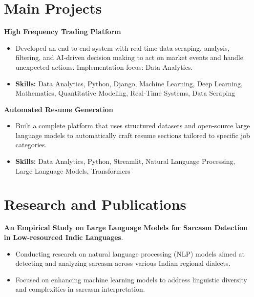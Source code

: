 \documentclass[a4paper,11pt]{article}
\begin{document}
\section{\textbf{Main Projects}}

\vspace{1mm}
  \textbf{High Frequency Trading Platform  }
\vspace{-1.5mm} %
\begin{itemize}
  \item Developed an end-to-end system with real-time data scraping, analysis, filtering, and AI-driven decision making to act on market events and handle unexpected actions. Implementation focus: Data Analytics.
\vspace{-3mm}
  \item \textbf{Skills:} Data Analytics, Python, Django, Machine Learning, Deep Learning, Mathematics, Quantitative Modeling, Real-Time Systems, Data Scraping
\end{itemize}


\vspace{1mm}
   \textbf{Automated Resume Generation }
\vspace{-1.5mm} %
\begin{itemize}
  \item Built a complete platform that uses structured datasets and open-source large language models to automatically craft resume sections tailored to specific job categories.
\vspace{-3mm}
  \item \textbf{Skills:} Data Analytics, Python, Streamlit, Natural Language Processing, Large Language Models, Transformers
\end{itemize}



\section{\textbf{Research and Publications} \hfill }
\vspace{1mm}
  \textbf{An Empirical Study on Large Language Models for Sarcasm Detection in Low-resourced Indic Languages}.
\vspace{-1mm} %
\begin{itemize}
  \item Conducting research on natural language processing (NLP) models aimed at detecting and analyzing sarcasm across various Indian regional dialects.
\vspace{-3mm}
  \item Focused on enhancing machine learning models to address linguistic diversity and complexities in sarcasm interpretation.
\end{itemize}
\end{document}
